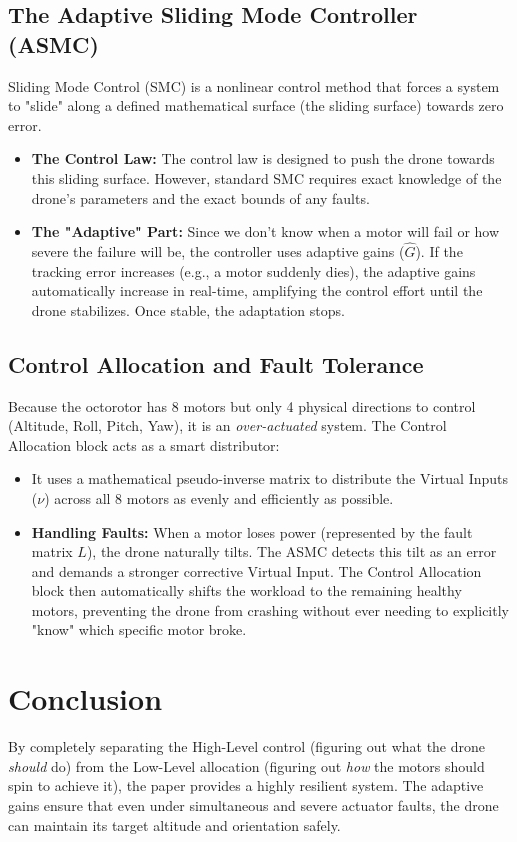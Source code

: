 \documentclass[12pt, a4paper]{article}
\begin{document}
\subsection{The Adaptive Sliding Mode Controller (ASMC)}
Sliding Mode Control (SMC) is a nonlinear control method that forces a system to "slide" along a defined mathematical surface (the sliding surface) towards zero error. 
\begin{itemize}
    \item \textbf{The Control Law:} The control law is designed to push the drone towards this sliding surface. However, standard SMC requires exact knowledge of the drone's parameters and the exact bounds of any faults.
    \item \textbf{The "Adaptive" Part:} Since we don't know when a motor will fail or how severe the failure will be, the controller uses adaptive gains ($\hat{G}$). If the tracking error increases (e.g., a motor suddenly dies), the adaptive gains automatically increase in real-time, amplifying the control effort until the drone stabilizes. Once stable, the adaptation stops.
\end{itemize}

\subsection{Control Allocation and Fault Tolerance}
Because the octorotor has 8 motors but only 4 physical directions to control (Altitude, Roll, Pitch, Yaw), it is an \textit{over-actuated} system. The Control Allocation block acts as a smart distributor:
\begin{itemize}
    \item It uses a mathematical pseudo-inverse matrix to distribute the Virtual Inputs ($\nu$) across all 8 motors as evenly and efficiently as possible.
    \item \textbf{Handling Faults:} When a motor loses power (represented by the fault matrix $L$), the drone naturally tilts. The ASMC detects this tilt as an error and demands a stronger corrective Virtual Input. The Control Allocation block then automatically shifts the workload to the remaining healthy motors, preventing the drone from crashing without ever needing to explicitly "know" which specific motor broke.
\end{itemize}

\section{Conclusion}
By completely separating the High-Level control (figuring out what the drone \textit{should} do) from the Low-Level allocation (figuring out \textit{how} the motors should spin to achieve it), the paper provides a highly resilient system. The adaptive gains ensure that even under simultaneous and severe actuator faults, the drone can maintain its target altitude and orientation safely.
\end{document}

